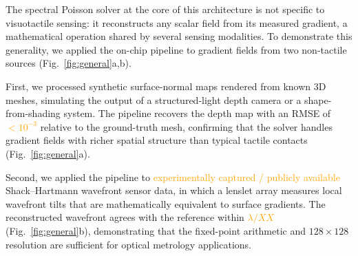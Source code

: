 \documentclass[10pt,a4paper]{article}
\newcommand{\placeholder}[1]{\textcolor{orange}{#1}}
\begin{document}
The spectral Poisson solver at the core of this architecture is not specific to visuotactile sensing: it reconstructs any scalar field from its measured gradient, a mathematical operation shared by several sensing modalities. To demonstrate this generality, we applied the on-chip pipeline to gradient fields from two non-tactile sources (Fig.~\ref{fig:general}a,b).

First, we processed synthetic surface-normal maps rendered from known 3D meshes, simulating the output of a structured-light depth camera or a shape-from-shading system. The pipeline recovers the depth map with an RMSE of \placeholder{$< 10^{-3}$} relative to the ground-truth mesh, confirming that the solver handles gradient fields with richer spatial structure than typical tactile contacts (Fig.~\ref{fig:general}a).

Second, we applied the pipeline to \placeholder{experimentally captured / publicly available} Shack--Hartmann wavefront sensor data, in which a lenslet array measures local wavefront tilts that are mathematically equivalent to surface gradients. The reconstructed wavefront agrees with the reference within \placeholder{$\lambda/XX$} (Fig.~\ref{fig:general}b), demonstrating that the fixed-point arithmetic and $128 \times 128$ resolution are sufficient for optical metrology applications.
\end{document}
